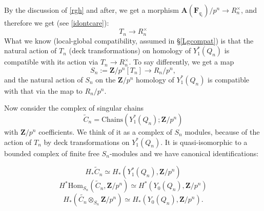 \documentclass[10pt]{amsart}
\newcommand{\Z}{\mathbf{Z}}
\newcommand{\Hom}{\mathrm{Hom}}
\newcommand{\Chains}{\mathrm{Chains}}
\theoremstyle{remark}
\begin{document}
  By the discussion  of  \eqref{rgh}  and after, we get a morphism
   $\mathbf{A}(\mathbf{F}_{q_i})/p^n \rightarrow R_n^{\times}$, and therefore we get (see \eqref{idontcare}): 
 $$T_n \rightarrow R_n^{\times}$$
 What we know (local-global compatibility, assumed in \S \ref{Lgcompat})  is that the natural action of $T_n$  (deck transformations) on homology of $Y_1^*(Q_n)$ 
is compatible with its action via $T_n \rightarrow R_n^{\times}$.  
 To say differently, we get a map \begin{equation} \label{Sndef} S_n := \Z/p^n[T_n] \rightarrow R_n/p^n, \end{equation}  and the natural action of $S_n$ on the $\Z/p^n$ homology of $Y_1^*(Q_n)$ is compatible
 with that via the map to $R_n/p^n$.   
 
  
  Now consider the complex of singular chains   $$ \widetilde{C}_n = \Chains(Y_1^*(Q_n); \Z/p^n)$$
  with $\Z/p^n$ coefficients.  We think of it as a complex of $S_n$ modules, because of the action of $T_n$ by deck transformations on $Y_1^*(Q_n)$.   It is quasi-isomorphic to a bounded complex of finite free $S_n$-modules
  and we have canonical identifications:
  
 \begin{equation} \label{id1} H_* \widetilde{C}_n \simeq H_*(Y_1^*(Q_n), \Z/p^n)\end{equation}
\begin{equation} \label{id2} H^*\Hom_{S_n}(\widetilde{C}_n, \Z/p^n) \simeq H^*(Y_0(Q_n), \Z/p^n)\end{equation}
\begin{equation} \label{id0} H_*( \widetilde{C_n} \otimes_{S_n} \Z/p^n) \simeq  H_*(Y_0(Q_n), \Z/p^n).\end{equation}
\end{document}
